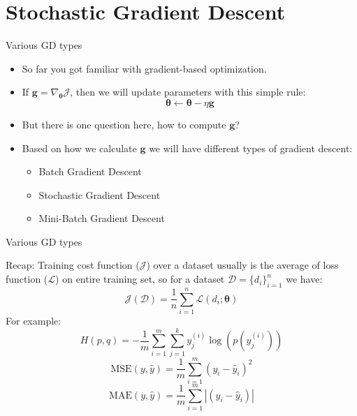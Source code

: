 \documentclass[compress,oilve,t]{beamer}
\begin{document}
\section{Stochastic Gradient Descent}
\begin{frame}{Various GD types}
	\begin{itemize}
		\item So far you got familiar with gradient-based optimization.
		\item If $\bm{g} = \nabla_{\bm{\theta}} \mathcal{J}$, then we will update parameters with this simple rule:
		\[
		\bm{\theta} \gets \bm{\theta} - \eta\bm{g}
		\]
		\item But there is one question here, how to compute $\bm{g}$?
		\item Based on how we calculate $\bm{g}$ we will have different types of gradient descent:
		\begin{itemize}
			\item Batch Gradient Descent
			\item Stochastic Gradient Descent
			\item Mini-Batch Gradient Descent
		\end{itemize}
	\end{itemize}
\end{frame}

\begin{frame}{Various GD types}
	\begin{block}{Recap:}
		Training cost function ($\mathcal{J}$) over a dataset usually is the average of loss function ($\mathcal{L}$) on entire training set, so for a dataset $\mathcal{D}=\{d_i\}_{i=1}^n$ we have:
		\[
		\mathcal{J}(\mathcal{D}) = \frac{1}{n} \sum_{i=1}^{n} \mathcal{L}(d_i; \bm{\theta})
		\]
		For example:
		\begin{equation*}
			H(p, q)=-\frac{1}{m} \sum_{i=1}^m\sum_{j=1}^{k} y_j^{(i)} \log (p(y_j^{(i)}))
		\end{equation*}
		\begin{equation*}
			\text{MSE}(y, \hat{y}) = \frac{1}{m}\sum_{i=1}^{m}(y_i-\hat{y}_i)^2
		\end{equation*}
		\begin{equation*}
			\text{MAE}(y, \hat{y}) = \frac{1}{m}\sum_{i=1}^{m}|(y_i-\hat{y}_i)|
		\end{equation*}
	\end{block}
\end{frame}
\end{document}
